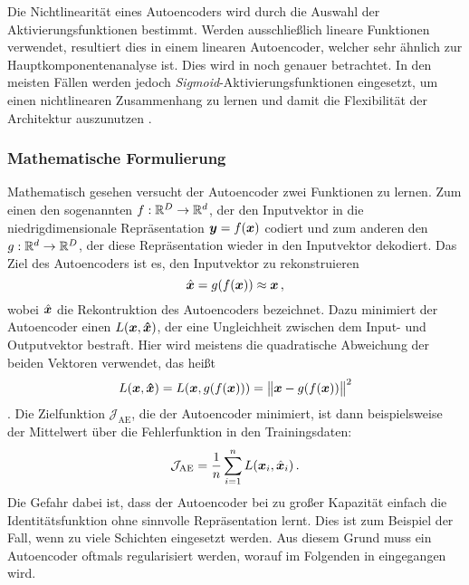 Die Nichtlinearität eines Autoencoders wird durch die Auswahl der Aktivierungsfunktionen bestimmt.
Werden ausschließlich lineare Funktionen verwendet, resultiert dies in einem linearen Autoencoder,
welcher sehr ähnlich zur Hauptkomponentenanalyse ist. Dies wird in
 noch genauer betrachtet. In den meisten
Fällen werden jedoch \textit{Sigmoid}-Aktivierungsfunktionen eingesetzt, um einen nichtlinearen
Zusammenhang zu lernen und damit die Flexibilität der Architektur auszunutzen \parencite[4]{Charte.2018}.

\subsubsection{Mathematische Formulierung}
\label{ch:MethodenDerDimRed:ML:AE:MathematischeFormulierung}
Mathematisch gesehen versucht der Autoencoder zwei Funktionen zu lernen. Zum einen den sogenannten  $f: \mathbb{R}^D \rightarrow \mathbb{R}^d$, der den Inputvektor in die niedrigdimensionale Repräsentation $\bm{y} = f(\bm{x})$ codiert und zum anderen den  $g: \mathbb{R}^d \rightarrow \mathbb{R}^D$, der diese Repräsentation wieder in den Inputvektor dekodiert. Das Ziel des Autoencoders ist es, den Inputvektor zu rekonstruieren
\begin{equation}
	\hat{\bm{x}} = g(f(\bm{x})) \approx \bm{x} \, ,
\end{equation}
wobei $\hat{\bm{x}}$ die Rekontruktion des Autoencoders bezeichnet.
Dazu minimiert der Autoencoder einen  $L(\bm{x}, \bm{\hat{x}})$, der eine Ungleichheit zwischen dem Input- und Outputvektor bestraft. Hier wird meistens die quadratische Abweichung der beiden Vektoren verwendet, das heißt
\begin{equation}
	\label{eq:MSE_loss}
	L(\vect{x}, \vect{\estNormal{x}}) = L(\vect{x}, g(f(\vect{x}))) = \norm[\big]{\vect{x} - g(f(\vect{x}))}^2
\end{equation}
\parencite[507]{Goodfellow.2016}. Die Zielfunktion $\mathcal{J}_{\text{AE}}$, die der Autoencoder
minimiert, ist dann beispielsweise der Mittelwert über die Fehlerfunktion in den Trainingsdaten:
\begin{equation}
	\label{eq:AE_objectiveFunction}
	\mathcal{J}_{\text{AE}} = \frac{1}{n} \sum_{i = 1}^n L(\vect{x}_i, \estNormal{\vect{x}}_i) \, .
\end{equation}
Die Gefahr dabei ist, dass der Autoencoder bei zu großer Kapazität einfach die Identitätsfunktion
ohne sinnvolle Repräsentation lernt. Dies ist zum Beispiel der Fall, wenn zu viele Schichten
eingesetzt werden. Aus diesem
Grund muss ein Autoencoder oftmals regularisiert werden, worauf im Folgenden in
 eingegangen wird.

